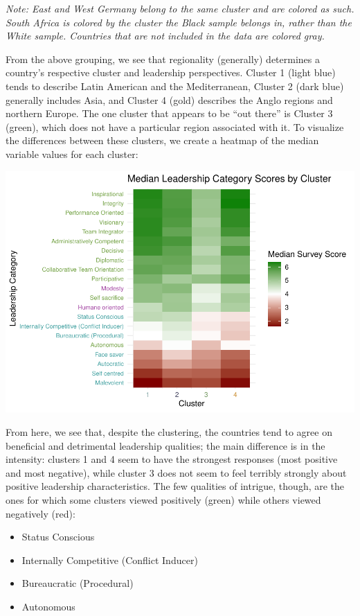 \documentclass[
]{article}
\providecommand{\tightlist}{%
  \setlength{\itemsep}{0pt}\setlength{\parskip}{0pt}}
\begin{document}
\emph{Note: East and West Germany belong to the same cluster and are
colored as such. South Africa is colored by the cluster the Black sample
belongs in, rather than the White sample. Countries that are not
included in the data are colored gray.}

From the above grouping, we see that regionality (generally) determines
a country's respective cluster and leadership perspectives. Cluster 1
(light blue) tends to describe Latin American and the Mediterranean,
Cluster 2 (dark blue) generally includes Asia, and Cluster 4 (gold)
describes the Anglo regions and northern Europe. The one cluster that
appears to be ``out there'' is Cluster 3 (green), which does not have a
particular region associated with it. To visualize the differences
between these clusters, we create a heatmap of the median variable
values for each cluster:

\begin{center}\includegraphics[width=0.85\linewidth]{report_files/figure-latex/cluster_values-1} \end{center}

From here, we see that, despite the clustering, the countries tend to
agree on beneficial and detrimental leadership qualities; the main
difference is in the intensity: clusters 1 and 4 seem to have the
strongest responses (most positive and most negative), while cluster 3
does not seem to feel terribly strongly about positive leadership
characteristics. The few qualities of intrigue, though, are the ones for
which some clusters viewed positively (green) while others viewed
negatively (red):

\begin{itemize}
\tightlist
\item
  Status Conscious
\item
  Internally Competitive (Conflict Inducer)
\item
  Bureaucratic (Procedural)
\item
  Autonomous
\end{itemize}
\end{document}
